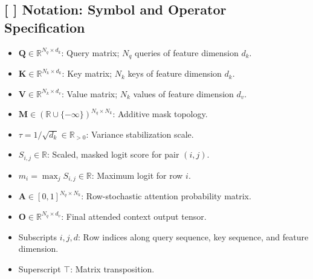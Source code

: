 \documentclass[11pt,a4paper]{article}
\theoremstyle{definition}
\begin{document}
\subsection{[ ] Notation: Symbol and Operator Specification}
\begin{itemize}
    \item $\mathbf{Q} \in \mathbb{R}^{N_q \times d_k}$: Query matrix; $N_q$ queries of feature dimension $d_k$.
    \item $\mathbf{K} \in \mathbb{R}^{N_k \times d_k}$: Key matrix; $N_k$ keys of feature dimension $d_k$.
    \item $\mathbf{V} \in \mathbb{R}^{N_k \times d_v}$: Value matrix; $N_k$ values of feature dimension $d_v$.
    \item $\mathbf{M} \in (\mathbb{R} \cup \{-\infty\})^{N_q \times N_k}$: Additive mask topology.
    \item $\tau = 1/\sqrt{d_k} \in \mathbb{R}_{> 0}$: Variance stabilization scale.
    \item $S_{i, j} \in \mathbb{R}$: Scaled, masked logit score for pair $(i, j)$.
    \item $m_i = \max_{j} S_{i, j} \in \mathbb{R}$: Maximum logit for row $i$.
    \item $\mathbf{A} \in [0, 1]^{N_q \times N_k}$: Row-stochastic attention probability matrix.
    \item $\mathbf{O} \in \mathbb{R}^{N_q \times d_v}$: Final attended context output tensor.
    \item Subscripts $i, j, d$: Row indices along query sequence, key sequence, and feature dimension.
    \item Superscript $\top$: Matrix transposition.
\end{itemize}
\end{document}
